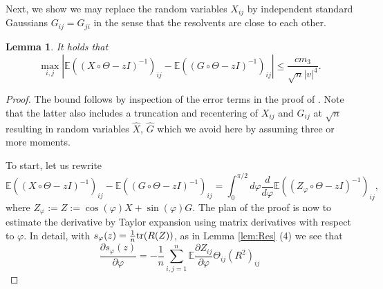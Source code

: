 \documentclass[a4paper,12pt]{amsart}
\numberwithin{equation}{section}
\newtheorem{lemma}[satz]{Lemma}
\theoremstyle{remark}
\def\E{{\mathbb E}}
\def\tr{{\rm tr}}
\begin{document}
Next, we show we may replace the random variables $X_{ij}$ by independent standard Gaussians $G_{ij}= G_{ji}$ in the sense that the resolvents are close to each other.

\begin{lemma}\label{lem:Gauss}
It holds that
\[ \max_{i,j}|\E  ((X\circ \Theta  -zI)^{-1})_{ij} -\E ((G\circ \Theta  -zI)^{-1})_{ij}| \le \frac{ c m_3 }{\sqrt{n} |v|^4}.
\]
\end{lemma}

\begin{proof}
The bound follows by inspection of the error terms in the proof of \cite[Th.\ 2]{GNT15}. Note that the latter also includes a truncation and recentering of $X_{ij}$ and $G_{ij}$ at $\sqrt{n}$ resulting in random variables $\hat{X}$, $\hat{G}$ which we avoid here by assuming three or more moments.

To start, let us rewrite
\[ \E  ((X\circ \Theta  -zI)^{-1})_{ij}
 -\E ((G\circ \Theta  -zI)^{-1})_{ij} = \int_0^{\pi/2} d\varphi \frac { d } {d \varphi}  \E  ((Z_{\varphi}\circ \Theta  -zI)^{-1})_{ij}, \]  
where $Z_{\varphi} := Z := \cos(\varphi) X +\sin(\varphi) G$. The plan of the proof is now to estimate the derivative by Taylor expansion using matrix derivatives with respect to $\varphi$. In detail, with $s_\varphi (z) = \frac{1}{n} \tr(R(Z))$, as in Lemma \ref{lem:Res} (4) we see that
\begin{equation}\label{eq:derivative}
    \frac{\partial s_\varphi(z)}{\partial \varphi} = -\frac{1}{n} \sum_{i,j = 1}^n \E \frac{\partial Z_{ij}}{\partial \varphi} \Theta_{ij} (R^2)_{ij}
\end{equation}


\end{proof}
\end{document}
